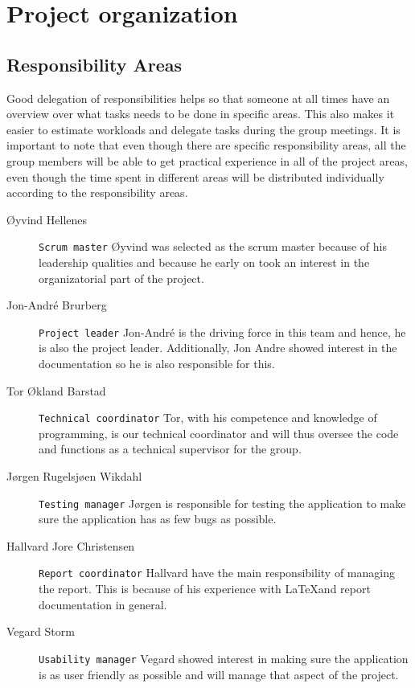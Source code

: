 \section{Project organization}
\thispagestyle{plain}
	\subsection{Responsibility Areas}

Good delegation of responsibilities helps so that someone at all times have an overview over what tasks needs to be done in specific areas. This also makes it easier to estimate workloads and delegate tasks during the group meetings. It is important to note that even though there are specific responsibility areas, all the group members will be able to get practical experience in all of the project areas, even though the time spent in different areas will be distributed individually according to the responsibility areas.

\begin{description}
\item[Øyvind Hellenes] \texttt{Scrum master} \hspace{8pt} Øyvind was selected as the scrum master because of his leadership qualities and because he early on took an interest in the organizatorial part of the project.
\item[Jon-André Brurberg] \texttt{Project leader}\hspace{8pt} Jon-André is the driving force in this team and hence, he is also the project leader. Additionally, Jon Andre showed interest in the documentation so he is also responsible for this.
\item[Tor Økland Barstad] \texttt{Technical coordinator} \hspace{8pt}Tor, with his competence and knowledge of programming, is our technical coordinator and will thus oversee the code and functions as a technical supervisor for the group.
\item[Jørgen Rugelsjøen Wikdahl] \texttt{Testing manager}\hspace{8pt} Jørgen is responsible for testing the application to make sure the application has as few bugs as possible.
\item[Hallvard Jore Christensen] \texttt{Report coordinator}  \hspace{8pt} Hallvard have the main responsibility of managing the report. This is because of his experience with \LaTeX and report documentation in general.
\item[Vegard Storm] \texttt{Usability manager}\hspace{8pt} Vegard showed interest in making sure the application is as user friendly as possible and will manage that aspect of the project.
\end{description}
	
